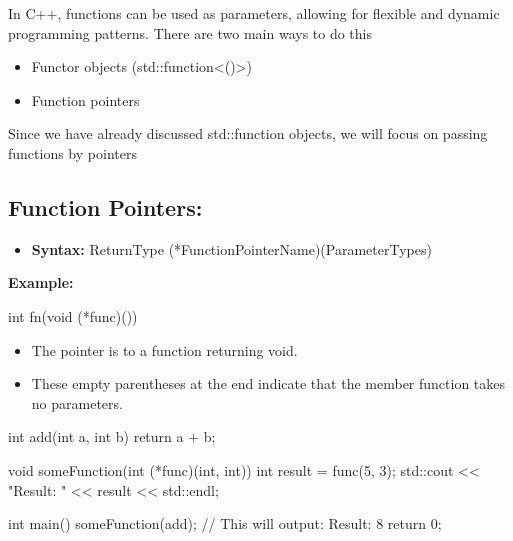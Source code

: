 \documentclass{report}
\begin{document}
    \pagebreak
    \begin{concept}
       In C++, functions can be used as parameters, allowing for flexible and dynamic programming patterns. There are two main ways to do this 
       \begin{itemize}
           \item Functor objects (std::function<()>)
            \item Function pointers
       \end{itemize}
    \end{concept}
    \bigbreak \noindent 
    Since we have already discussed std::function objects, we will focus on passing functions by pointers
    \bigbreak \noindent 
    \subsection{Function Pointers:}
    \bigbreak \noindent 
    \begin{itemize}
        \item \textbf{Syntax:} ReturnType (*FunctionPointerName)(ParameterTypes)
    \end{itemize}
    \bigbreak \noindent 
    \textbf{Example:}
    \bigbreak \noindent 
    \begin{cppcode}
    int fn(void (*func)())
    \end{cppcode}
    \bigbreak \noindent 
    \begin{itemize}
        \item The pointer is to a function returning void.
        \item These empty parentheses at the end indicate that the member function takes no parameters.
    \end{itemize}
    \bigbreak \noindent 
    \begin{cppcode}
int add(int a, int b) {
    return a + b;
}

void someFunction(int (*func)(int, int)) {
    int result = func(5, 3);
    std::cout << "Result: " << result << std::endl;
}

int main() {
    someFunction(add);  // This will output: Result: 8
    return 0;
}
    \end{cppcode}
    \pagebreak 
\end{document}
